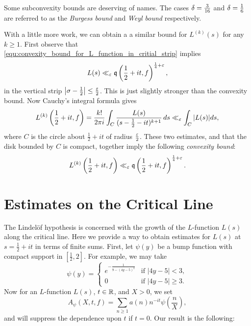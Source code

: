 \documentclass[12pt]{article}
\begin{document}
    \begin{remark}
      Some subconvexity bounds are deserving of names. The cases \(\delta = \frac{3}{16}\) and \(\delta = \frac{1}{6}\) are referred to as the \textit{Burgess bound} and \textit{Weyl bound} respectively.
    \end{remark}
    
    With a little more work, we can obtain a a similar bound for \(L^{(k)}(s)\) for any \(k \ge 1\). First observe that \cref{equ:convexity_bound_for_L_function_in_critial_strip} implies
    \[
      L(s) \ll_{\varepsilon} \mathfrak{q}\left(\frac{1}{2}+it,f\right)^{\frac{1}{4}+\varepsilon},
    \]
    in the vertical strip \(\left|\sigma-\frac{1}{2}\right| \le \frac{\varepsilon}{2}\). This is just slightly stronger than the convexity bound. Now Cauchy's integral formula gives
    \[
      L^{(k)}\left(\frac{1}{2}+it,f\right) = \frac{k!}{2\pi i}\int_{C}\frac{L(s)}{(s-\frac{1}{2}-it)^{k+1}}\,ds \ll_{\varepsilon} \int_{C}|L(s)|ds,
    \]
    where \(C\) is the circle about \(\frac{1}{2}+it\) of radius \(\frac{\varepsilon}{2}\). These two estimates, and that the disk bounded by \(C\) is compact, together imply the following \textit{convexity bound}:
    \[
      L^{(k)}\left(\frac{1}{2}+it,f\right) \ll_{\varepsilon} \mathfrak{q}\left(\frac{1}{2}+it,f\right)^{\frac{1}{4}+\varepsilon}.
    \]
  \section{Estimates on the Critical Line}
    The Lindel\"of hypothesis is concerned with the growth of the \(L\)-function \(L(s)\) along the critical line. Here we provide a way to obtain estimates for \(L(s)\) at \(s = \frac{1}{2}+it\) in terms of finite sums. First, let \(\psi(y)\) be a bump function with compact support in \(\left[\frac{1}{2},2\right]\). For example, we may take
    \[
      \psi(y) = \begin{cases} e^{-\frac{1}{9-(4y-5)^{2}}} & \text{if \(|4y-5| < 3\)}, \\ 0 & \text{if \(|4y-5| \ge 3\)}. \end{cases}
    \]
    Now for an \(L\)-function \(L(s)\), \(t \in \mathbb{R}\), and \(X > 0\), we set
    \[
      A_{\psi}(X,t,f) = \sum_{n \ge 1}a(n)n^{-it}\psi\left(\frac{n}{X}\right),
    \]
    and will suppress the dependence upon \(t\) if \(t = 0\). Our result is the following:
\end{document}
